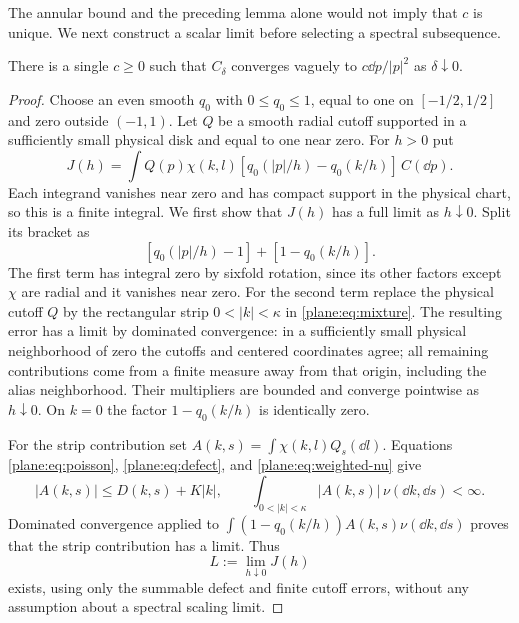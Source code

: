 The annular bound and the preceding lemma alone would not imply that
$c$ is unique.  We next construct a scalar limit before selecting a
spectral subsequence.

\begin{lemma}
\label{plane:lem:unique}
There is a single $c\ge0$ such that $C_\delta$ converges vaguely to
$c\dd p/|p|^2$ as $\delta\downarrow0$.
\end{lemma}

\begin{proof}
Choose an even smooth $q_0$ with $0\le q_0\le1$, equal to one on
$[-1/2,1/2]$ and zero outside $(-1,1)$.  Let $Q$ be a smooth radial
cutoff supported in a sufficiently small physical disk and equal to
one near zero.  For $h>0$ put
\begin{equation}
 \label{plane:eq:cutoff}
 J(h)=\int Q(p)\chi(k,l)
       [q_0(|p|/h)-q_0(k/h)]\,C(\dd p).
\end{equation}
Each integrand vanishes near zero and has compact support in the
physical chart, so this is a finite integral.
We first show that $J(h)$ has a full limit as $h\downarrow0$.
Split its bracket as
\[
 [q_0(|p|/h)-1]+[1-q_0(k/h)].
\]
The first term has integral zero by sixfold rotation, since its other
factors except $\chi$ are radial and it vanishes near zero.
For the second term replace the physical cutoff $Q$ by the rectangular
strip $0<|k|<\kappa$ in \eqref{plane:eq:mixture}.  The resulting error
has a limit by dominated convergence: in a sufficiently small physical
neighborhood of zero the cutoffs and centered coordinates agree;
all remaining contributions come from a finite measure away from
that origin, including the alias neighborhood.  Their multipliers
are bounded and converge pointwise as $h\downarrow0$.  On $k=0$
the factor $1-q_0(k/h)$ is identically zero.

For the strip contribution set
$A(k,s)=\int\chi(k,l)Q_s(\dd l)$.  Equations
\eqref{plane:eq:poisson}, \eqref{plane:eq:defect}, and
\eqref{plane:eq:weighted-nu} give
\[
 |A(k,s)|\le D(k,s)+K|k|,
 \qquad
 \int_{0<|k|<\kappa}|A(k,s)|\,\nu(\dd k,\dd s)<\infty.
\]
Dominated convergence applied to
$\int(1-q_0(k/h))A(k,s)\nu(\dd k,\dd s)$ proves that the strip
contribution has a limit.  Thus
\begin{equation}
 \label{plane:eq:cutoff-full-limit}
 L:=\lim_{h\downarrow0}J(h)
\end{equation}
exists, using only the summable defect and finite cutoff errors,
without any assumption about a spectral scaling limit.


\end{proof}

